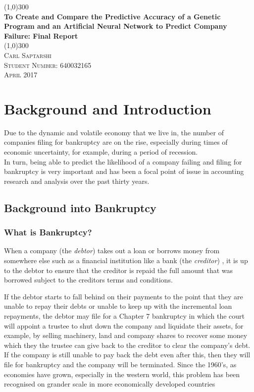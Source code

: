 \documentclass[11pt]{article}
\begin{document}
	\begin{titlepage}
		\begin{center}
			\line(1,0){300}\\
			[0.25in]
			\huge{\bfseries To Create and Compare the Predictive Accuracy of a Genetic Program and an Artificial Neural Network to Predict Company Failure: Final Report}\\
			\line(1,0){300}\\
			[1.5cm]
			
			 \textsc{Carl Saptarshi}\\
			 \textsc{\large  Student Number: 640032165 \\
			 April 2017}
			 
		\end{center}
	\end{titlepage}

\tableofcontents
\thispagestyle{empty}

\cleardoublepage
\setcounter{page}{1}
\section{Background and Introduction }\label{sec:intro}
Due to the dynamic and volatile economy that we live in, the number of companies filing for bankruptcy are on the rise, especially during times of economic uncertainty, for example, during a period of recession.\\
In turn, being able to predict the likelihood of a company failing and filing for bankruptcy is very important and has been a focal point of issue in accounting research and analysis over the past thirty years. 

\subsection{Background into Bankruptcy}
\subsubsection{What is Bankruptcy? }\label{sec:bankdef}
When a company (the \textit{debtor}) takes out a loan or borrows money from somewhere else such as a financial institution like a bank (the \textit{creditor}) , it is up to the debtor to ensure that the creditor is repaid the full amount that was borrowed subject to the creditors terms and conditions.


If the debtor starts to fall behind on their payments to the point that they are unable to repay their debts or unable to keep up with the incremental loan repayments, the debtor may file for a Chapter 7 bankruptcy in which the court will appoint a trustee to shut down the company and liquidate their assets, for example, by selling machinery, land and company shares to recover some money which they the trustee can give back to the creditor to clear the company's debt. If the company is still unable to pay back the debt even after this, then they will file for bankruptcy and the company will be terminated. Since the 1960's, as economies have grown, especially in the western world, this problem has been recognised on grander scale in more economically developed countries \cite{?}
\end{document}
